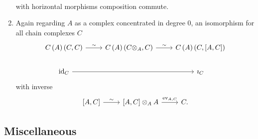\documentclass[dissertation.tex]{subfiles}
\begin{document}
\begin{rmk}
\begin{enumerate}
$$\begin{tikzcd}
    \end{tikzcd}$$
    with horizontal morphisms composition commute.
  \item
    Again regarding $A$ as a complex concentrated in degree 0, an isomorphism for all chain complexes $C$
    $$\begin{tikzcd}
      \Ch{A}\left(C,C\right) \arrow{r}{\sim} & 
      \Ch{A}\left(C \otimes_A,C\right) \arrow{r}{\sim}&
      \Ch{A}\left(C,\left[A,C\right]\right)\\
      \id_C \arrow{rr} & & \imath_C
    \end{tikzcd}$$
    with inverse
    $$\begin{tikzcd}
      \left[A,C\right] \arrow{r}{\sim} & \left[A,C\right] \otimes_A A \arrow{r}{\operatorname{ev}_{A,C}} & C.
    \end{tikzcd}$$
  \end{enumerate}
\end{rmk}

\subsection{Miscellaneous}
\end{document}
